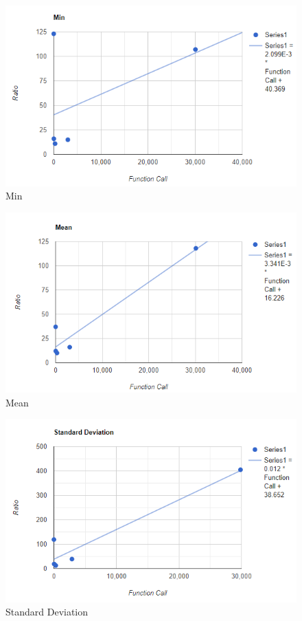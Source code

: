 \documentclass[a4paper, 12pt, titlepage]{article}
\begin{document}
    \begin{figure}[H]
	\centering
	\caption{Min}
	\label{fig:Min}
	\includegraphics[width=.85\textwidth]{hfd4.PNG} %
\end{figure}
\newpage

    \begin{figure}[H]
	\centering
	\caption{Mean}
	\label{fig:Mean}
	\includegraphics[width=.85\textwidth]{hfd5.PNG} %
\end{figure}

    \begin{figure}[H]
	\centering
	\caption{Standard Deviation}
	\label{fig:Standard Deviation}
	\includegraphics[width=.85\textwidth]{hfd6.PNG} %
\end{figure}
\newpage
\end{document}
